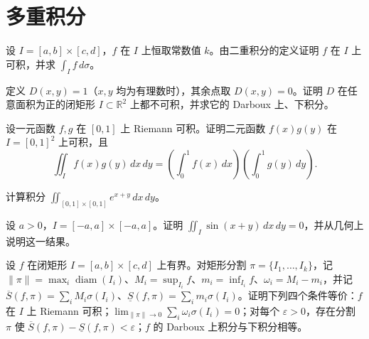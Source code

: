 \renewcommand{\thesection}{\arabic{section}}\renewcommand{\theHsection}{chapter.\arabic{section}}\setcounter{section}{9}\section{多重积分}
\noindent\begin{minipage}{\textwidth}
设 $I=[a,b]\times[c,d]$，$f$ 在 $I$ 上恒取常数值 $k$。由二重积分的定义证明 $f$ 在 $I$ 上可积，并求 $\int_I f\,d\sigma$。
\end{minipage}\par\vfill
\noindent\begin{minipage}{\textwidth}
定义 $D(x,y)=1$（$x,y$ 均为有理数时），其余点取 $D(x,y)=0$。证明 $D$ 在任意面积为正的闭矩形 $I\subset\mathbb R^2$ 上都不可积，并求它的 Darboux 上、下积分。
\end{minipage}\par\vfill
\noindent\begin{minipage}{\textwidth}
设一元函数 $f,g$ 在 $[0,1]$ 上 Riemann 可积。证明二元函数 $f(x)g(y)$ 在 $I=[0,1]^2$ 上可积，且\[\iint_I f(x)g(y)\,dx\,dy=\left(\int_0^1f(x)\,dx\right)\left(\int_0^1g(y)\,dy\right).\]
\end{minipage}\par\vfill
\newpage
\noindent\begin{minipage}{\textwidth}
计算积分 $\displaystyle\iint_{[0,1]\times[0,1]}e^{x+y}\,dx\,dy$。
\end{minipage}\par\vfill
\noindent\begin{minipage}{\textwidth}
设 $a>0$，$I=[-a,a]\times[-a,a]$。证明 $\iint_I\sin(x+y)\,dx\,dy=0$，并从几何上说明这一结果。
\end{minipage}\par\vfill
\noindent\begin{minipage}{\textwidth}
设 $f$ 在闭矩形 $I=[a,b]\times[c,d]$ 上有界。对矩形分割 $\pi=\{I_1,\ldots,I_k\}$，记 $\|\pi\|=\max_i\operatorname{diam}(I_i)$、$M_i=\sup_{I_i}f$、$m_i=\inf_{I_i}f$、$\omega_i=M_i-m_i$，并记 $\overline S(f,\pi)=\sum_iM_i\sigma(I_i)$、$\underline S(f,\pi)=\sum_im_i\sigma(I_i)$。证明下列四个条件等价：$f$ 在 $I$ 上 Riemann 可积；$\lim_{\|\pi\|\to0}\sum_i\omega_i\sigma(I_i)=0$；对每个 $\varepsilon>0$，存在分割 $\pi$ 使 $\overline S(f,\pi)-\underline S(f,\pi)<\varepsilon$；$f$ 的 Darboux 上积分与下积分相等。
\end{minipage}\par\vfill
